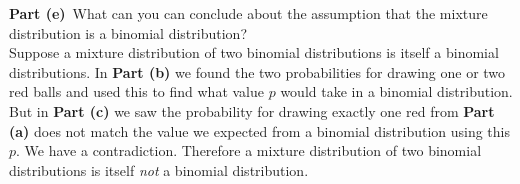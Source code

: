 \documentclass[12pt]{article}
\theoremstyle{definition}
\begin{document}
\newpage
\noindent
{\bf Part (e)}\ What can you can conclude about the assumption that the mixture distribution is a binomial distribution?\\

Suppose a mixture distribution of two binomial distributions is itself a binomial distributions. In \textbf{Part (b)} we found the two probabilities for drawing one or two red balls and used this to find what value $p$ would take in a binomial distribution. But in \textbf{Part (c)} we saw the probability for drawing exactly one red from \textbf{Part (a)} does not match the value we expected from a binomial distribution using this $p$. We have a contradiction. Therefore a mixture distribution of two binomial distributions is itself \textit{not} a binomial distribution.
\end{document}
